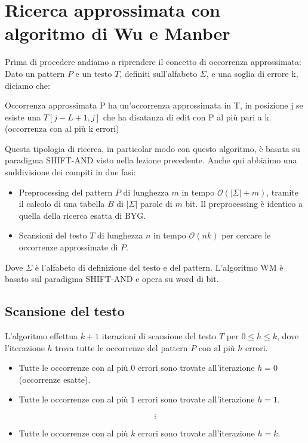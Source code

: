 \section{Ricerca approssimata con algoritmo di Wu e Manber }
Prima di procedere andiamo a riprendere il concetto di occorrenza approssimata:
Dato un pattern $P$ e un testo $T$, definiti sull'alfabeto $\Sigma$, e una soglia di errore k, diciamo che:
\begin{teorema}{Occorrenza approssimata}{}
    P ha un'occorrenza approssimata in T, in posizione j se esiste una $T[j-L+1, j]$ che ha disatanza di edit con P al più pari a k. (occorrenza con al più k errori)
\end{teorema}
Questa tipologia di ricerca, in particolar modo con questo algoritmo, è basata su paradigma SHIFT-AND visto nella lezione precedente. Anche qui abbiaimo una suddivisione dei compiti in due fasi:
\begin{itemize}
    \item Preprocessing del pattern $P$ di lunghezza $m$ in tempo $\mathcal{O}(|\Sigma|+m)$, tramite il calcolo di una tabella $B$ di $|\Sigma|$ parole di $m$ bit.
     Il preprocessing è identico a quella della ricerca esatta di BYG.
     \item  Scansioni del testo $T$ di lunghezza $n$ in tempo $\mathcal{O}(nk)$ per cercare le occorrenze approssimate di $P$.
\end{itemize}
Dove $\Sigma$ è l’alfabeto di definizione del testo e del pattern. L’algoritmo WM è basato sul paradigma SHIFT-AND e opera su word di bit.\\

\subsection{Scansione del testo}
L’algoritmo effettua $k+1$ iterazioni di scansione del testo $T$ per $0 \leq h \leq k$, dove l’iterazione $h$ trova tutte le occorrenze del pattern $P$ con al più $h$ errori.
\begin{itemize}
    \item Tutte le occorrenze con al più $0$ errori sono trovate all’iterazione $h=0$ (occorrenze esatte).
    \item Tutte le occorrenze con al più $1$ errori sono trovate all’iterazione $h=1$.
\end{itemize}
\[\vdots\]
\begin{itemize}
    \item Tutte le occorrenze con al più $k$ errori sono trovate all’iterazione $h=k$.
\end{itemize}

